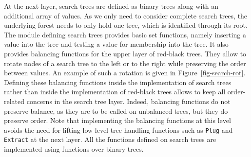 \documentclass{llncs}
\begin{document}



At the next layer, search trees are defined as binary trees along with an
additional array of values. As we only need to consider complete search trees,
the underlying forest needs to only hold one tree, which is identified through
its root. The module defining search trees provides basic set functions, namely
inserting a value into the tree and testing a value for membership into the
tree. It also provides balancing functions for the upper layer of red-black
trees. They allow to rotate nodes of a search tree to the left or to the right
while preserving the order between values. An example of such a rotation is
given in Figure~\ref{fig-search-rot}.  Defining these balancing functions
inside the implementation of search trees rather than inside the implementation
of red-black trees allows to keep all order-related concerns in the search tree
layer. Indeed, balancing functions do not preserve balance, as they are to be
called on unbalanced trees, but they do preserve order. Note that implementing
the balancing functions at this level avoids the need for lifting low-level
tree handling functions such as \texttt{Plug} and \texttt{Extract} at the next
layer. All the functions defined on search trees are implemented using
functions over binary trees.

\end{document}
